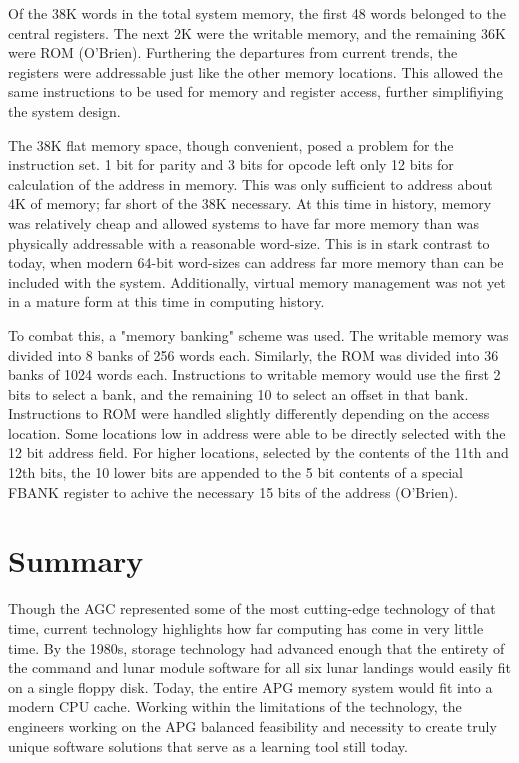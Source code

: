 \documentclass[a4paper,11pt]{article}
\begin{document}
Of the 38K words in the total system memory, the first 48 words belonged to the central registers.  The next 2K were the writable memory, and the remaining 36K were ROM (O'Brien).  Furthering the departures from current trends, the registers were addressable just like the other memory locations.  This allowed the same instructions to be used for memory and register access, further simplifiying the system design.  

The 38K flat memory space, though convenient, posed a problem for the instruction set.  1 bit for parity and 3 bits for opcode left only 12 bits for calculation of the address in memory.  This was only sufficient to address about 4K of memory; far short of the 38K necessary.  At this time in history, memory was relatively cheap and allowed systems to have far more memory than was physically addressable with a reasonable word-size. This is in stark contrast to today, when modern 64-bit word-sizes can address far more memory than can be included with the system.  Additionally, virtual memory management was not yet in a mature form at this time in computing history. 

To combat this, a "memory banking" scheme was used. The writable memory was divided into 8 banks of 256 words each.  Similarly, the ROM was divided into 36 banks of 1024 words each.  Instructions to writable memory would use the first 2 bits to select a bank, and the remaining 10 to select an offset in that bank.  Instructions to ROM were handled slightly differently depending on the access location.  Some locations low in address were able to be directly selected with the 12 bit address field.  For higher locations, selected by the contents of the 11th and 12th bits, the 10 lower bits are appended to the 5 bit contents of a special FBANK register to achive the necessary 15 bits of the address (O'Brien).  


\section{Summary}
Though the AGC represented some of the most cutting-edge technology of that time, current technology highlights how far computing has come in very little time.  By the 1980s, storage technology had advanced enough that the entirety of the command and lunar module software for all six lunar landings would easily fit on a single floppy disk.  Today, the entire APG memory system would fit into a modern CPU cache. Working within the limitations of the technology, the engineers working on the APG balanced feasibility and necessity to create truly unique software solutions that serve as a learning tool still today.
\end{document}
